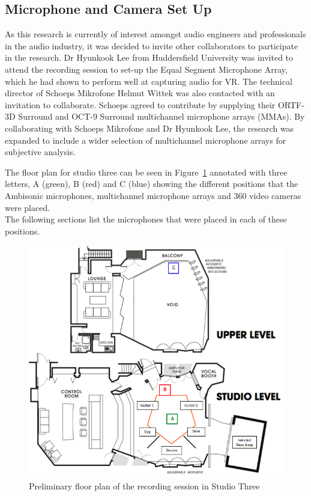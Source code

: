 	\subsection{Microphone and Camera Set Up}

		As this research is currently of interest amongst audio engineers and professionals in the audio industry, it was decided to invite other collaborators to participate in the research. Dr Hyunkook Lee from Huddersfield University was invited to attend the recording session to set-up the Equal Segment Microphone Array, which he had shown to perform well at capturing audio for VR. The technical director of Schoeps Mikrofone Helmut Wittek was also contacted with an invitation to collaborate. Schoeps agreed to contribute by supplying their ORTF-3D Surround and OCT-9 Surround multichannel microphone arrays (MMAs). By collaborating with Schoeps Mikrofone and Dr Hyunkook Lee, the research was expanded to include a wider selection of multichannel microphone arrays for subjective analysis. 

		The floor plan for studio three can be seen in Figure~\ref{FloorPlan} annotated with three letters, A (green), B (red) and C (blue) showing the different positions that the Ambisonic microphones, multichannel microphone arrays and 360\textdegree{} video cameras were placed. \\



		 The following sections list the microphones that were placed in each of these positions.

		\begin{figure}
			\begin{center}
				\includegraphics[width = 0.8\linewidth]{images/other/FloorPlan.png}
				\caption{Preliminary floor plan of the recording session in Studio Three \cite{Studio3}}
				\label{FloorPlan}
			\end{center}
		\end{figure}

